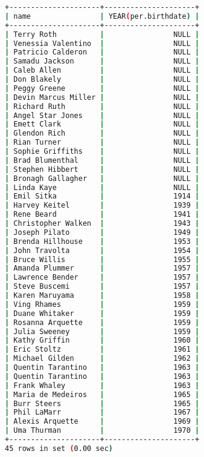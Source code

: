 \begin{lstlisting}[language=bash]
+---------------------+---------------------+
| name                | YEAR(per.birthdate) |
+---------------------+---------------------+
| Terry Roth          |                NULL |
| Venessia Valentino  |                NULL |
| Patricio Calderon   |                NULL |
| Samadu Jackson      |                NULL |
| Caleb Allen         |                NULL |
| Don Blakely         |                NULL |
| Peggy Greene        |                NULL |
| Devin Marcus Miller |                NULL |
| Richard Ruth        |                NULL |
| Angel Star Jones    |                NULL |
| Emett Clark         |                NULL |
| Glendon Rich        |                NULL |
| Rian Turner         |                NULL |
| Sophie Griffiths    |                NULL |
| Brad Blumenthal     |                NULL |
| Stephen Hibbert     |                NULL |
| Bronagh Gallagher   |                NULL |
| Linda Kaye          |                NULL |
| Emil Sitka          |                1914 |
| Harvey Keitel       |                1939 |
| Rene Beard          |                1941 |
| Christopher Walken  |                1943 |
| Joseph Pilato       |                1949 |
| Brenda Hillhouse    |                1953 |
| John Travolta       |                1954 |
| Bruce Willis        |                1955 |
| Amanda Plummer      |                1957 |
| Lawrence Bender     |                1957 |
| Steve Buscemi       |                1957 |
| Karen Maruyama      |                1958 |
| Ving Rhames         |                1959 |
| Duane Whitaker      |                1959 |
| Rosanna Arquette    |                1959 |
| Julia Sweeney       |                1959 |
| Kathy Griffin       |                1960 |
| Eric Stoltz         |                1961 |
| Michael Gilden      |                1962 |
| Quentin Tarantino   |                1963 |
| Quentin Tarantino   |                1963 |
| Frank Whaley        |                1963 |
| Maria de Medeiros   |                1965 |
| Burr Steers         |                1965 |
| Phil LaMarr         |                1967 |
| Alexis Arquette     |                1969 |
| Uma Thurman         |                1970 |
+---------------------+---------------------+
45 rows in set (0.00 sec)
\end{lstlisting}

